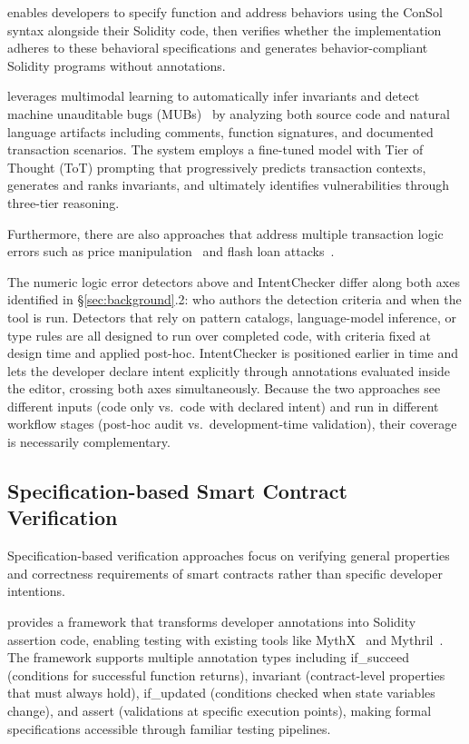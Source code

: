 \documentclass[pdflatex,sn-basic]{sn-jnl}%
\theoremstyle{thmstyleone}%
\theoremstyle{thmstyletwo}%
\theoremstyle{thmstylethree}%
\begin{document}
\citep{consolidating} enables developers to specify function and address behaviors using the ConSol syntax alongside their Solidity code,
then verifies whether the implementation adheres to these behavioral specifications and generates behavior-compliant Solidity programs without annotations.

\citep{smartinv} leverages multimodal learning to automatically infer invariants and detect machine unauditable bugs (MUBs)~\citep{exploitablebugs}
by analyzing both source code and natural language artifacts including comments, function signatures, and documented transaction scenarios.
The system employs a fine-tuned model with Tier of Thought (ToT) prompting that progressively predicts transaction contexts,
generates and ranks invariants, and ultimately identifies vulnerabilities through three-tier reasoning.

Furthermore, there are also approaches that address multiple transaction logic errors such as price manipulation~\citep{defiranger,defiguard,pomabuster,secplf,defitainter}
and flash loan attacks~\citep{defitail,midnight}.

The numeric logic error detectors above and IntentChecker differ along both axes identified in \S\ref{sec:background}.2: who authors the detection criteria and when the tool is run.
Detectors that rely on pattern catalogs, language-model inference, or type rules are all designed to run over completed code, with criteria fixed at design time and applied post-hoc.
IntentChecker is positioned earlier in time and lets the developer declare intent explicitly through annotations evaluated inside the editor, crossing both axes simultaneously.
Because the two approaches see different inputs (code only vs.\ code with declared intent) and run in different workflow stages (post-hoc audit vs.\ development-time validation), their coverage is necessarily complementary.

\subsection{Specification-based Smart Contract Verification}
Specification-based verification approaches focus on verifying general properties and correctness requirements of smart contracts rather than specific developer intentions.

\citep{scribble} provides a framework that transforms developer annotations into Solidity assertion code,
enabling testing with existing tools like MythX~\citep{mythx} and Mythril~\citep{mythril}.
The framework supports multiple annotation types including if\_succeed (conditions for successful function returns),
invariant (contract-level properties that must always hold), if\_updated (conditions checked when state variables change),
and assert (validations at specific execution points), making formal specifications accessible through familiar testing pipelines.
\end{document}
